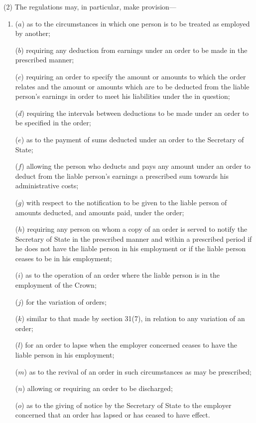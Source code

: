 \documentclass[12pt,a4paper]{article}
\begin{document}
(2) The regulations may, in particular, make provision---
\begin{enumerate}\item[]
($a$) as to the circumstances in which one person is to be treated as employed
by another;

($b$) requiring any deduction from earnings under an order to be made in the
prescribed manner;


($c$) requiring an order to specify the amount or amounts to which the order relates and the amount or amounts which are to be deducted from the liable person’s earnings in order to meet his liabilities under the  in question;

($d$) requiring the intervals between deductions to be made under an order to be specified in the order;

($e$) as to the payment of sums deducted under an order to the Secretary of State;

($f$) allowing the person who deducts and pays any amount under an order to deduct from the liable person’s earnings a prescribed sum towards his administrative costs;

($g$) with respect to the notification to be given to the liable person of amounts deducted, and amounts paid, under the order;

($h$) requiring any person on whom a copy of an order is served to notify the Secretary of State in the prescribed manner and within a prescribed period if he does not have the liable person in his employment or if the liable person ceases to be in his employment;

($i$) as to the operation of an order where the liable person is in the employment of the Crown;

($j$) for the variation of orders;

($k$) similar to that made by section 31(7), in relation to any variation of an order;

($l$) for an order to lapse when the employer concerned ceases to have the liable person in his employment;

($m$) as to the revival of an order in such circumstances as may be prescribed;

($n$) allowing or requiring an order to be discharged;

($o$) as to the giving of notice by the Secretary of State to the employer concerned that an order has lapsed or has ceased to have effect.
\end{enumerate}
\end{document}
